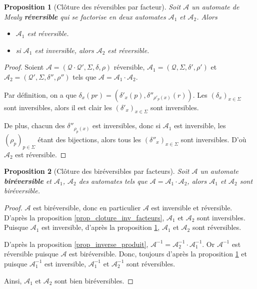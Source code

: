 \documentclass[11pt,a4paper]{article}
\newtheorem{prop}{Proposition}
\begin{document}
\begin{prop}[Clôture des réversibles par facteur]\label{prop_cloture_rev_facteurs}
  Soit $\mathcal{A}$ un automate de Mealy \textbf{réversible} qui se factorise en deux automates $\mathcal{A}_1$ et $\mathcal{A}_2$. Alors
  \begin{itemize}
  \item $\mathcal{A}_1$ est réversible.
  \item si $\mathcal{A}_1$ est inversible, alors $\mathcal{A}_2$ est réversible.
  \end{itemize}
\end{prop}

\begin{proof}
  Soient $\mathcal{A}=\left(\mathcal{Q\cdot Q'}, \Sigma, \delta, \rho\right)$ réversible, $\mathcal{A}_1=\left(\mathcal{Q}, \Sigma, \delta', \rho'\right)$ et $\mathcal{A}_2=\left(\mathcal{Q'}, \Sigma, \delta'', \rho''\right)$ tels que $\mathcal{A} = \mathcal{A}_1\cdot\mathcal{A}_2$.

  Par définition, on a que $\delta_x(pr) = (\delta'_x(p), \delta''_{\rho'_p(x)}(r))$. Les ${(\delta_x)}_{x\in\Sigma}$ sont inversibles, alors il est clair les ${(\delta'_x)}_{x\in\Sigma}$ sont inversibles.

  De plus, chacun des $\delta''_{\rho_p(x)}$ est inversibles, donc si $\mathcal{A}_1$ est inversible, les ${(\rho_p)}_{p\in\Sigma}$ étant des bijections, alors tous les ${(\delta''_x)}_{x\in\Sigma}$ sont inversibles. D'où $\mathcal{A}_2$ est réversible.
\end{proof}

\begin{prop}[Clôture des biréversibles par facteurs]
  Soit $\mathcal{A}$ un automate \textbf{biréversible} et $\mathcal{A}_1$, $\mathcal{A}_2$ des automates tels que $\mathcal{A}=\mathcal{A}_1\cdot\mathcal{A}_2$, alors $\mathcal{A}_1$ et $\mathcal{A}_2$ sont biréversible.
\end{prop}

\begin{proof}
    $\mathcal{A}$ est biréversible, donc en particulier $\mathcal{A}$ est inversible et réversible. D'après la proposition \ref{prop_cloture_inv_facteurs}, $\mathcal{A}_1$ et $\mathcal{A}_2$ sont inversibles. Puisque $\mathcal{A}_1$ est inversible, d'après la proposition \ref{prop_cloture_rev_facteurs}, $\mathcal{A}_1$ et $\mathcal{A}_2$ sont réversibles.

    D'après la proposition \ref{prop_inverse_produit}, $\mathcal{A}^{-1} = \mathcal{A}_2^{-1} \cdot \mathcal{A}_1^{-1}$. Or $\mathcal{A}^{-1}$ est réversible puisque $\mathcal{A}$ est biréversible. Donc, toujours d'après la proposition \ref{prop_cloture_rev_facteurs} et puisque $\mathcal{A}_1^{-1}$ est inversible, $\mathcal{A}_1^{-1}$ et $\mathcal{A}_2^{-1}$ sont réversibles.

    Ainsi, $\mathcal{A}_1$ et $\mathcal{A}_2$ sont bien biréversibles.
\end{proof}
\end{document}
